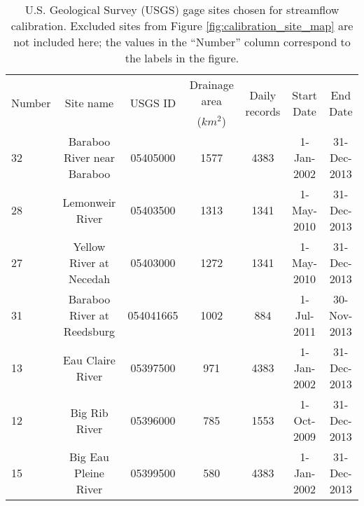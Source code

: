 \begin{table}[h]
	\caption[Gage sites chosen for streamflow calibration]{U.S. Geological Survey (USGS) gage sites chosen for streamflow calibration. Excluded sites from Figure \ref{fig:calibration_site_map} are not included here; the values in the ``Number'' column correspond to the labels in the figure.}
	\centering
\begin{tabular}{l c ccccc}
\hline
\multirow{2}{*}{Number}	&\multirow{2}{*}{Site name}          & \multirow{2}{*}{USGS ID} & 			Drainage area  			& \multirow{2}{*}{Daily records} & \multirow{2}{*}{Start Date} & \multirow{2}{*}{End Date} \\
						& 							 		& 					  		& 	($km^2$)  						 & 								  	&  								& \\
\hline \hline
32	&	Baraboo  River near Baraboo            & 05405000                    & 1577                                    & 4383                              & 1-Jan-2002                     & 31-Dec-2013                  \\
28	&	Lemonweir River                        & 05403500                    & 1313                                    & 1341                              & 1-May-2010                     & 31-Dec-2013                  \\
27	&	Yellow  River at Necedah               & 05403000                    & 1272                                    & 1341                              & 1-May-2010                     & 31-Dec-2013                  \\
31	&	Baraboo  River at Reedsburg            & 054041665                   & 1002                                    & 884                               & 1-Jul-2011                     & 30-Nov-2013                  \\
13	&	Eau Claire River                       & 05397500                    & 971                                     & 4383                              & 1-Jan-2002                     & 31-Dec-2013                  \\
12	&	Big Rib River                          & 05396000                    & 785                                     & 1553                              & 1-Oct-2009                     & 31-Dec-2013                  \\
15	&	Big Eau Pleine River                   & 05399500                    & 580                                     & 4383                              & 1-Jan-2002                     & 31-Dec-2013                  \\

\end{tabular}
\end{table}
